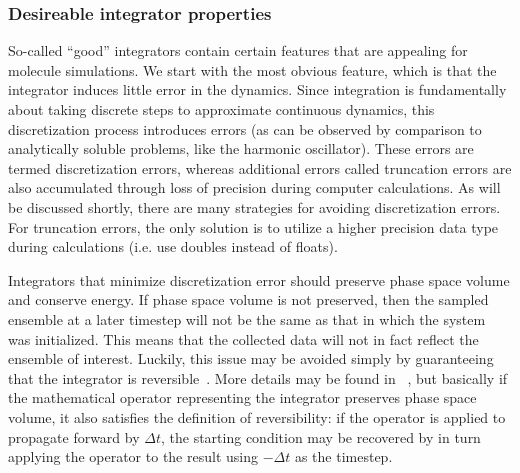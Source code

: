 \documentclass[9pt,bestpractices]{livecoms}
\begin{document}
\subsubsection{Desireable integrator properties}

So-called ``good'' integrators contain certain features that are appealing for molecule simulations.
We start with the most obvious feature, which is that the integrator induces little error in the dynamics.
Since integration is fundamentally about taking discrete steps to approximate continuous dynamics, this discretization process introduces errors (as can be observed by comparison to analytically soluble problems, like the harmonic oscillator).
These errors are termed discretization errors, whereas additional errors called truncation errors are also accumulated through loss of precision during computer calculations.
As will be discussed shortly, there are many strategies for avoiding discretization errors.
For truncation errors, the only solution is to utilize a higher precision data type during calculations (i.e. use doubles instead of floats).

Integrators that minimize discretization error should preserve phase space volume and conserve energy.
If phase space volume is not preserved, then the sampled ensemble at a later timestep will not be the same as that in which the system was initialized.
This means that the collected data will not in fact reflect the ensemble of interest.
Luckily, this issue may be avoided simply by guaranteeing that the integrator is reversible~\cite{Frenkel:2001:}.
More details may be found in ~\citet{Tuckerman:1992:}, but basically if the mathematical operator representing the integrator preserves phase space volume, it also satisfies the definition of reversibility: if the operator is applied to propagate forward by $\Delta t$, the starting condition may be recovered by in turn applying the operator to the result using $- \Delta t$ as the timestep.
\end{document}
